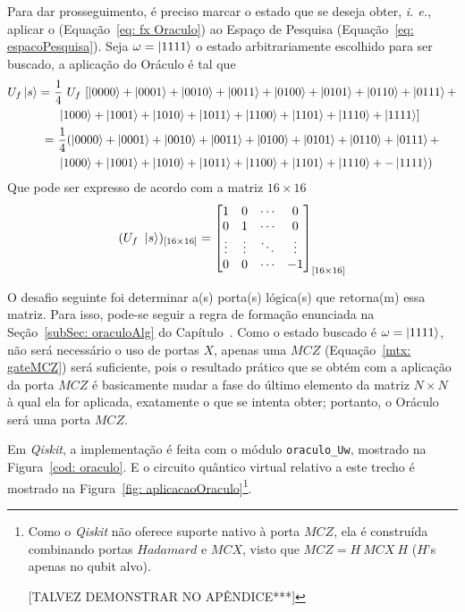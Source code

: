 Para dar prosseguimento, é preciso marcar o estado que se deseja obter, \emph{i. e.}, aplicar o  (Equaç\~{a}o~\ref{eq: fx Oraculo}) ao Espaço de Pesquisa (Equaç\~{a}o~\ref{eq: espacoPesquisa}). Seja $\omega = \ket{1111}$ o estado arbitrariamente escolhido para ser buscado, a aplicação do Oráculo é tal que
%
\begin{align}
    \notag
    U_f\ket{s} = ~& \frac{1}{4}~U_f~[\ket{0000} + \ket{0001} + \ket{0010} + \ket{0011} + \ket{0100} + \ket{0101} + \ket{0110} +\ket{0111} + \\ \notag
    &~ \ket{1000} + \ket{1001} + \ket{1010} + \ket{1011} + \ket{1100} + \ket{1101} + \ket{1110} + \ket{1111}] \\
    \label{eq: aplicacaoOraculo}
    = &~ \frac{1}{4}(\ket{0000} + \ket{0001} + \ket{0010} + \ket{0011} + \ket{0100} + \ket{0101} + \ket{0110} +\ket{0111} + \\ \notag
    &~ \ket{1000} + \ket{1001} + \ket{1010} + \ket{1011} + \ket{1100} + \ket{1101} + \ket{1110} + -\ket{1111})
\end{align}
%
Que pode ser expresso de acordo com a matriz $16 \times 16$
%
\begin{equation*}
    (U_{f}~\ket{s})_{[16 \times 16]} = \begin{bmatrix}
        1 & 0 &  \cdots  & 0\\
        0 & 1 &  \cdots  & 0\\
        \vdots & \vdots & \ddots & \vdots \\
        0 & 0 &  \cdots  & -1\\
    \end{bmatrix}_{[16 \times 16]} 
    \label{mtx: aplicacaoOraculo}
\end{equation*}

O desafio seguinte foi determinar a(s) porta(s) lógica(s) que retorna(m) essa matriz. Para isso, pode-se seguir a regra de formação enunciada na Seção~\ref{subSec: oraculoAlg} do Capítulo~. Como o estado buscado é $\omega = \ket{1111}$, não será necessário o uso de portas $X$, apenas uma $MCZ$ (Equação~\ref{mtx: gateMCZ}) será suficiente, pois o resultado prático que se obtém com a aplicação da porta $MCZ$ é basicamente mudar a fase do último elemento da matriz $N \times N$ à qual ela for aplicada, exatamente o que se intenta obter; portanto, o Oráculo será uma porta $MCZ$.

Em \emph{Qiskit}, a implementação é feita com o módulo \verb|oraculo_Uw|, mostrado na Figura~\ref{cod: oraculo}. E o circuito quântico virtual relativo a este trecho é mostrado na Figura~\ref{fig: aplicacaoOraculo}\footnote
{
Como o \emph{Qiskit} não oferece suporte nativo à porta $MCZ$, ela é construída combinando portas $Hadamard$ e $MCX$, visto que $MCZ=H~MCX~H$ ($H$'s apenas no qubit alvo).

[TALVEZ DEMONSTRAR NO APÊNDICE***]
}.

